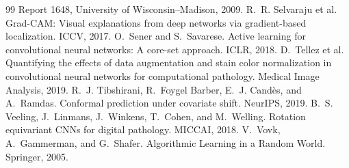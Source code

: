 \documentclass[10pt,twocolumn]{article}
\begin{document}
{\begin{thebibliography}{99}
Report 1648, University of Wisconsin--Madison, 2009.
 R.~R. Selvaraju et al. Grad-CAM: Visual explanations from deep networks
via gradient-based localization. ICCV, 2017.
 O.~Sener and S.~Savarese. Active learning for convolutional neural networks:
A core-set approach. ICLR, 2018.
 D.~Tellez et al. Quantifying the effects of data augmentation and stain
color normalization in convolutional neural networks for computational pathology. Medical Image
Analysis, 2019.
 R.~J. Tibshirani, R.~Foygel Barber, E.~J. Cand\`es, and A.~Ramdas.
Conformal prediction under covariate shift. NeurIPS, 2019.
 B.~S. Veeling, J.~Linmans, J.~Winkens, T.~Cohen, and M.~Welling. Rotation
equivariant CNNs for digital pathology. MICCAI, 2018.
 V.~Vovk, A.~Gammerman, and G.~Shafer. Algorithmic Learning in a Random World.
Springer, 2005.
\end{thebibliography}}
\end{document}
